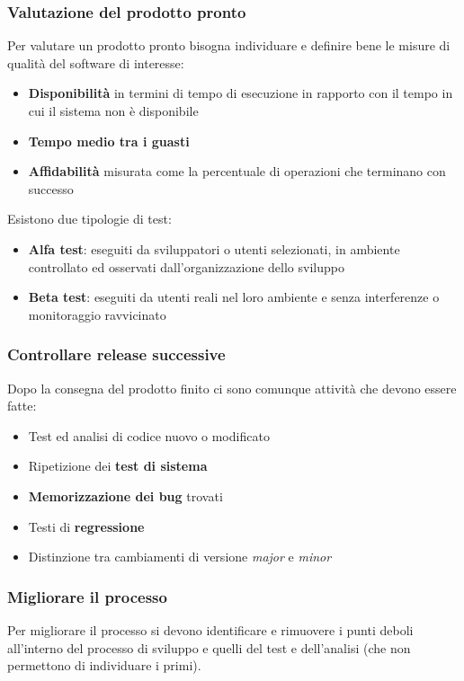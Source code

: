 \subsubsection{Valutazione del prodotto pronto}
Per valutare un prodotto pronto bisogna individuare e definire bene le misure di qualità del software di interesse:
\begin{itemize}
	\item \textbf{Disponibilità} in termini di tempo di esecuzione in rapporto con il tempo in cui il sistema non è disponibile
	\item \textbf{Tempo medio tra i guasti}
	\item \textbf{Affidabilità} misurata come la percentuale di operazioni che terminano con successo
\end{itemize}
Esistono due tipologie di test:
\begin{itemize}
	\item \textbf{Alfa test}: eseguiti da sviluppatori o utenti selezionati, in ambiente controllato ed osservati dall'organizzazione dello sviluppo
	\item \textbf{Beta test}: eseguiti da utenti reali nel loro ambiente e senza interferenze o monitoraggio ravvicinato
\end{itemize}


\subsubsection{Controllare release successive}
Dopo la consegna del prodotto finito ci sono comunque attività che devono essere fatte:
\begin{itemize}
	\item Test ed analisi di codice nuovo o modificato
	\item Ripetizione dei \textbf{test di sistema}
	\item \textbf{Memorizzazione dei bug} trovati
	\item Testi di \textbf{regressione}
	\item Distinzione tra cambiamenti di versione \textit{major} e \textit{minor}
\end{itemize}

\subsubsection{Migliorare il processo}
Per migliorare il processo si devono identificare e rimuovere i punti deboli all'interno del processo di sviluppo e quelli del test e dell'analisi (che non permettono di individuare i primi).

